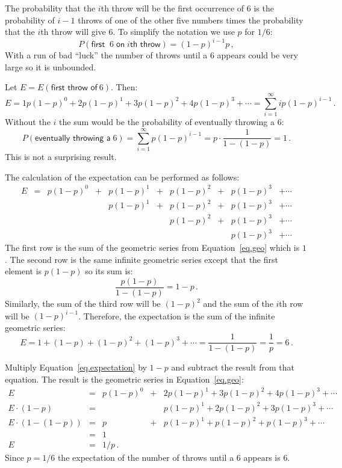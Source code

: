 
The probability that the $i$th throw will be the first occurrence of $6$ is the probability of $i-1$ throws of one of the other five numbers times the probability that the $i$th throw will give $6$. To simplify the notation we use $p$ for $1/6$:
\[
P(\textsf{first }\:6\; \textsf{on}\;i \textsf{th throw})=(1-p)^{i-1}p\,,
\]
With a run of bad ``luck'' the number of throws until a $6$ appears could be very large so it is unbounded.

Let $E=E(\textsf{first throw of}\:6)$. Then:
\begin{equation}\label{eq.expectation}
E=1p(1-p)^0 + 2p(1-p)^1+ 3p(1-p)^2+ 4p(1-p)^3 +\cdots =\sum_{i=1}^{\infty} ip(1-p)^{i-1}\,.
\end{equation}
Without the $i$ the sum would be the probability of eventually throwing a $6$:
\begin{equation}\label{eq.geo}
P(\textsf{eventually throwing a}\;6)= \sum_{i=1}^{\infty} p(1-p)^{i-1}=p\cdot\frac{1}{1-(1-p)}=1\,.
\end{equation}
This is not a surprising result.

The calculation of the expectation can be performed as follows:
\[
\begin{array}{llllllllll}
E&=&p(1-p)^0 &+& p(1-p)^1&+& p(1-p)^2&+& p(1-p)^3 &+\cdots \\
& & &&p(1-p)^1&+& p(1-p)^2&+& p(1-p)^3 &+\cdots \\
&  &&&& &p(1-p)^2&+& p(1-p)^3 &+\cdots \\
&&&&&&&&p(1-p)^3 &+\cdots
\end{array}
\]
The first row is the sum of the geometric series from Equation~\ref{eq.geo} which is $1$. The second row is the same infinite geometric series except that the first element is $p(1-p)$ so its sum is:
\[
\frac{p(1-p)}{1-(1-p)}=1-p\,.
\]
Similarly, the sum of the third row will be $(1-p)^2$ and the sum of the $i$th row will be $(1-p)^{i-1}$. Therefore, the expectation is the sum of the infinite geometric series:
\[
E= 1 + (1-p) + (1-p)^2 + (1-p)^3 + \cdots= \frac{1}{1-(1-p)}=\frac{1}{p}=6\,.
\]


Multiply Equation~\ref{eq.expectation} by $1-p$ and subtract the result from that equation. The result is the geometric series in Equation~\ref{eq.geo}:
\[
\begin{array}{rclcl}
E&=&p(1-p)^0 &+&2p(1-p)^1+ 3p(1-p)^2+ 4p(1-p)^3 +\cdots\\
E\cdot(1-p)&=&&&p(1-p)^1 + 2p(1-p)^2+ 3p(1-p)^3 +\cdots \\
E\cdot(1-(1-p)) &=& p &+& p(1-p)^1 + p(1-p)^2 + p(1-p)^3 +\cdots\\
&=&1\\
E&=&1/p\,.
\end{array}
\]
Since $p=1/6$ the expectation of the number of throws until a $6$ appears is $6$.

